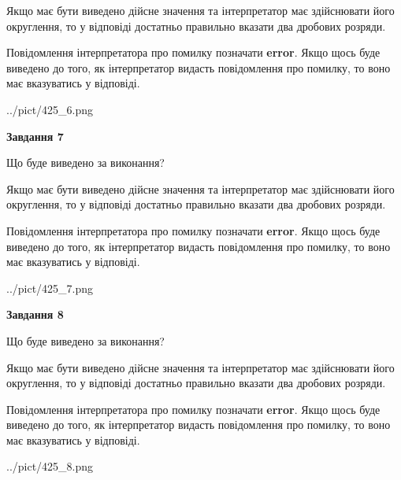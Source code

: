 \documentclass[12pt, ukrainian]{article}
\begin{document}
{\begin {Large}
Якщо має бути виведено дійсне значення та інтерпретатор має здійснювати його округлення, 
то у відповіді достатньо правильно вказати два дробових розряди.

Повідомлення інтерпретатора про помилку позначати \textbf{error}.
Якщо щось буде виведено до того, як інтерпретатор видасть повідомлення про помилку, 
то воно має вказуватись у відповіді. \par

\begin{center}
	{../pict/425_6.png}
\end{center}
\newpage

{\begin {center}\textbf{Завдання 7}\end {center}}\par
Що буде виведено за виконання? \par

Якщо має бути виведено дійсне значення та інтерпретатор має здійснювати його округлення, 
то у відповіді достатньо правильно вказати два дробових розряди.

Повідомлення інтерпретатора про помилку позначати \textbf{error}.
Якщо щось буде виведено до того, як інтерпретатор видасть повідомлення про помилку, 
то воно має вказуватись у відповіді. \par

\begin{center}
	{../pict/425_7.png}
\end{center}
\newpage

{\begin {center}\textbf{Завдання 8}\end {center}}\par
Що буде виведено за виконання? \par

Якщо має бути виведено дійсне значення та інтерпретатор має здійснювати його округлення, 
то у відповіді достатньо правильно вказати два дробових розряди.

Повідомлення інтерпретатора про помилку позначати \textbf{error}.
Якщо щось буде виведено до того, як інтерпретатор видасть повідомлення про помилку, 
то воно має вказуватись у відповіді. \par

\begin{center}
	{../pict/425_8.png}
\end{center}
\newpage


\end{Large}}
\end{document}
